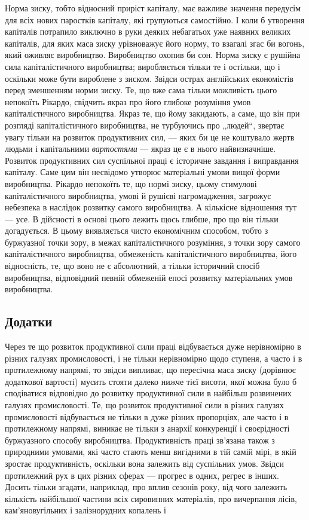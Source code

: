 Норма зиску, тобто відносний приріст капіталу, має важливе
значення передусім для всіх нових паростків капіталу, які групуються
самостійно. І коли б утворення капіталів потрапило
виключно в руки деяких небагатьох уже наявних великих
капіталів, для яких маса зиску урівноважує його норму, то
взагалі згас би вогонь, який оживляє виробництво. Виробництво
охопив би сон. Норма зиску є рушійна сила капіталістичного
виробництва; виробляється тільки те і остільки, що і оскільки
може бути вироблене з зиском. Звідси острах англійських економістів
перед зменшенням норми зиску. Те, що вже сама тільки
можливість цього непокоїть Рікардо, свідчить якраз про його
глибоке розуміння умов капіталістичного виробництва. Якраз те,
що йому закидають, а саме, що він при розгляді капіталістичного
виробництва, не турбуючись про „людей“, звертає увагу
тільки на розвиток продуктивних сил, — яких би це не коштувало
жертв людьми і капітальними \emph{вартостями} — якраз це є
в нього найвизначніше. Розвиток продуктивних сил суспільної
праці є історичне завдання і виправдання капіталу. Саме цим він
несвідомо утворює матеріальні умови вищої форми виробництва.
Рікардо непокоїть те, що нормі зиску, цьому стимулові капіталістичного
виробництва, умові й рушієві нагромадження, загрожує
небезпека в наслідок розвитку самого виробництва. А кількісне
відношення тут — усе. В дійсності в основі цього лежить щось
глибше, про що він тільки догадується. В цьому виявляється
чисто економічним способом, тобто з буржуазної точки зору,
в межах капіталістичного розуміння, з точки зору самого капіталістичного
виробництва, обмеженість капіталістичного виробництва,
його відносність, те, що воно не є абсолютний, а тільки
історичний спосіб виробництва, відповідний певній обмеженій
епосі розвитку матеріальних умов виробництва.

\subsection{Додатки}

Через те що розвиток продуктивної сили праці відбувається
дуже нерівномірно в різних галузях промисловості, і не тільки
нерівномірно щодо ступеня, а часто і в протилежному напрямі,
то звідси випливає, що пересічна маса зиску (дорівнює додаткової
вартості) мусить стояти далеко нижче тієї висоти, якої можна
було б сподіватися відповідно до розвитку продуктивної сили
в найбільш розвинених галузях промисловості. Те, що розвиток
продуктивної сили в різних галузях промисловості відбувається
не тільки в дуже різних пропорціях, але часто і в протилежному
напрямі, виникає не тільки з анархії конкуренції і своєрідності
буржуазного способу виробництва. Продуктивність праці
зв’язана також з природними умовами, які часто стають менш
вигідними в тій самій мірі, в якій зростає продуктивність, оскільки
вона залежить від суспільних умов. Звідси протилежний рух
в цих різних сферах — прогрес в одних, регрес в інших. Досить
тільки згадати, наприклад, про вплив сезонів року, від чого
залежить кількість найбільшої частини всіх сировинних матеріалів,
про вичерпання лісів, кам’яновугільних і залізнорудних
копалень і~

